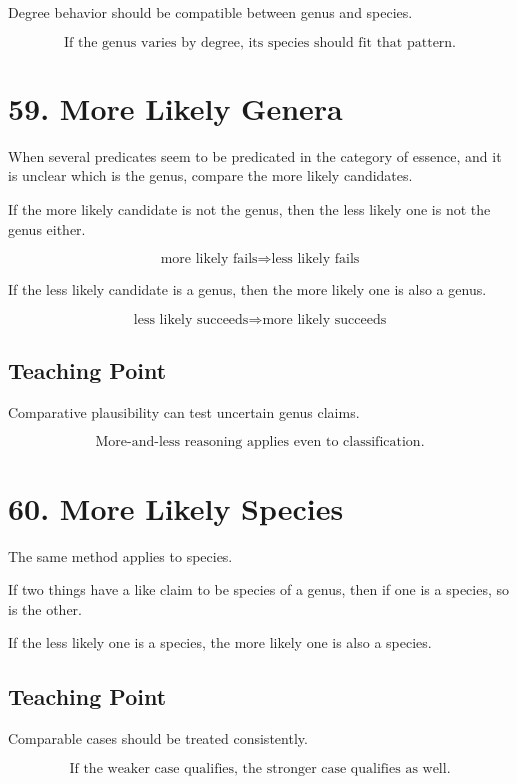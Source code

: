 \documentclass[12pt]{article}
\begin{document}
Degree behavior should be compatible between genus and species.

\[
\boxed{
\text{If the genus varies by degree, its species should fit that pattern.}
}
\]

\section*{59. More Likely Genera}

When several predicates seem to be predicated in the category of essence, and it
is unclear which is the genus, compare the more likely candidates.

If the more likely candidate is not the genus, then the less likely one is not
the genus either.

\[
\text{more likely fails} \Rightarrow \text{less likely fails}
\]

If the less likely candidate is a genus, then the more likely one is also a
genus.

\[
\text{less likely succeeds} \Rightarrow \text{more likely succeeds}
\]

\subsection*{Teaching Point}

Comparative plausibility can test uncertain genus claims.

\[
\boxed{
\text{More-and-less reasoning applies even to classification.}
}
\]

\section*{60. More Likely Species}

The same method applies to species.

If two things have a like claim to be species of a genus, then if one is a
species, so is the other.

If the less likely one is a species, the more likely one is also a species.

\subsection*{Teaching Point}

Comparable cases should be treated consistently.

\[
\boxed{
\text{If the weaker case qualifies, the stronger case qualifies as well.}
}
\]
\end{document}

